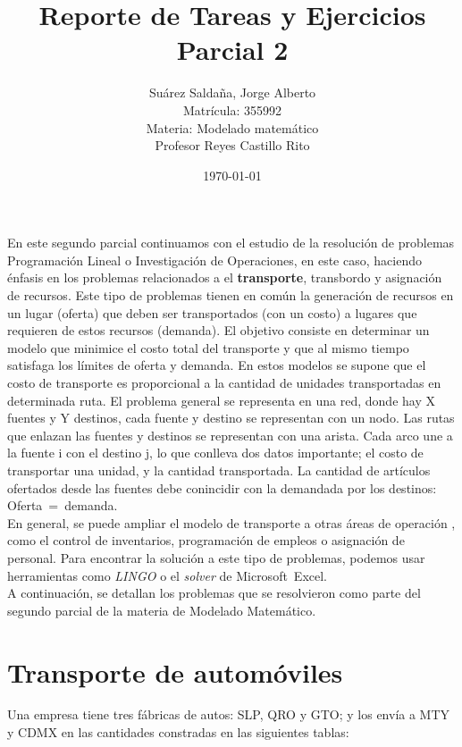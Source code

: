 \documentclass[12pt]{article}  %
\title{Reporte de Tareas y Ejercicios Parcial 2}  %
\author{Suárez Saldaña, Jorge Alberto \\ Matrícula: 355992 \\[1ex] Materia: Modelado matemático \\ Profesor Reyes Castillo Rito}  %
\date{\today}  %
\begin{document}
\maketitle
En este segundo parcial continuamos con el estudio de la resolución de problemas Programación Lineal o Investigación de Operaciones, en este caso, haciendo énfasis en los problemas relacionados a el \textbf{transporte}, transbordo y asignación de recursos.
Este tipo de problemas tienen en común la generación de recursos en un lugar (oferta) que deben ser transportados (con un costo) a lugares que requieren de estos recursos (demanda).
El objetivo consiste en determinar un modelo que minimice el costo total del transporte y que al mismo tiempo satisfaga los límites de oferta y demanda.
En estos modelos se supone que el costo de transporte es proporcional a la cantidad de unidades transportadas en determinada ruta.
El problema general se representa en una red, donde hay X fuentes y Y destinos, cada fuente y destino se representan con un nodo. Las rutas que enlazan las fuentes y destinos se representan con una arista.
Cada arco une a la fuente i con el destino j, lo que conlleva dos datos importante; el costo de transportar una unidad, y la cantidad transportada.
La cantidad de artículos ofertados desde las fuentes debe conincidir con la demandada por los destinos: \mbox{Oferta = demanda}.\\
En general, se puede ampliar el modelo de transporte a otras áreas de operación , como el control de inventarios, programación de empleos o asignación de personal.
Para encontrar la solución a este tipo de problemas, podemos usar herramientas como \mbox{\textit{LINGO}} o el \mbox{\textit{solver}} de \mbox{Microsoft Excel}.\\ A continuación, se detallan los problemas que se resolvieron como parte del segundo parcial de la materia de Modelado Matemático.

\section{Transporte de automóviles}
Una empresa tiene tres fábricas de autos: SLP, QRO y GTO; y los envía a MTY y CDMX en las cantidades constradas en las siguientes tablas:
\end{document}
